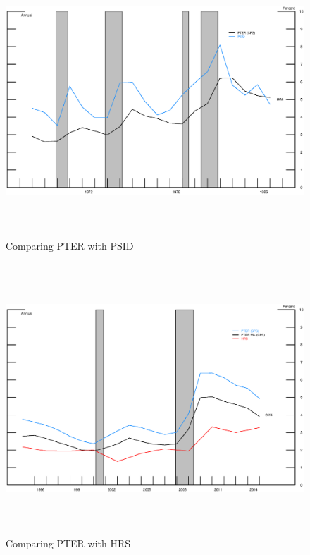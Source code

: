 \clearpage
\begin{figure}[h]
\begin{center}
\caption{Comparing PTER with PSID \label{inf}}
\includegraphics[width=5in, height=4in]{figure1.eps}
\end{center}
\end{figure}

\newpage

\begin{figure}[h]
\begin{center}
\caption{Comparing PTER with HRS \label{inf}}
\includegraphics[width=5in, height=4in]{figure2.eps}
\end{center}
\end{figure}

